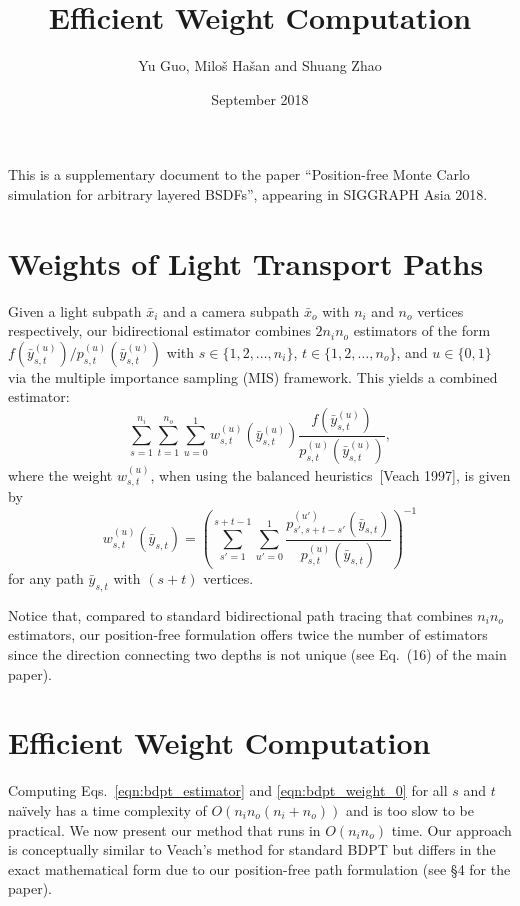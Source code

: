 \documentclass[11pt]{article}
\title{Efficient Weight Computation}
\date{September 2018}
\author{Yu Guo, Milo\v s Ha\v san and Shuang Zhao}
\begin{document}
\maketitle

This is a supplementary document to the paper ``Position-free Monte Carlo simulation for arbitrary layered BSDFs'', appearing in SIGGRAPH Asia 2018.

\section{Weights of Light Transport Paths}

Given a light subpath $\bar{x}_i$ and a camera subpath $\bar{x}_o$ with $n_i$ and $n_o$ vertices respectively, our bidirectional estimator combines $2 n_i n_o$ estimators of the form $f(\bar{y}^{(u)}_{s,t})/p^{(u)}_{s,t}(\bar{y}^{(u)}_{s,t})$ with $s \in \{1, 2, \ldots, n_i\}$, $t \in \{1, 2, \ldots, n_o\}$, and $u \in \{0, 1\}$ via the multiple importance sampling (MIS) framework.
This yields a combined estimator:
%
\begin{equation}
\label{eqn:bdpt_estimator}
\sum_{s = 1}^{n_i} \sum_{t = 1}^{n_o} \sum_{u = 0}^1 w^{(u)}_{s, t}(\bar{y}^{(u)}_{s,t}) \frac{f(\bar{y}^{(u)}_{s,t})}{p^{(u)}_{s,t}(\bar{y}^{(u)}_{s,t})},
\end{equation}
%
where the weight $w^{(u)}_{s, t}$, when using the balanced heuristics~[Veach 1997], is given by
%
\begin{equation}
\label{eqn:bdpt_weight_0}
w^{(u)}_{s, t}(\bar{y}_{s,t})
= \left(\sum_{s' = 1}^{s + t - 1} \sum_{u'=0}^1 \frac{p^{(u')}_{s', s + t - s'}(\bar{y}_{s,t})}{p^{(u)}_{s,t}(\bar{y}_{s,t})}\right)^{-1}
\end{equation}
%
for any path $\bar{y}_{s,t}$ with $(s + t)$ vertices.

Notice that, compared to standard bidirectional path tracing that combines $n_i n_o$ estimators, our position-free formulation offers twice the number of estimators since the direction connecting two depths is not unique (see Eq.~(16) of the main paper).


\section{Efficient Weight Computation}

Computing Eqs.~\eqref{eqn:bdpt_estimator} and \eqref{eqn:bdpt_weight_0} for all $s$ and $t$ na\"ively has a time complexity of $O(n_i n_o (n_i + n_o))$ and is too slow to be practical.
We now present our method that runs in $O(n_i n_o)$ time.
Our approach is conceptually similar to Veach's method for standard BDPT but differs in the exact mathematical form due to our position-free path formulation (see \S4 for the paper).
\end{document}
